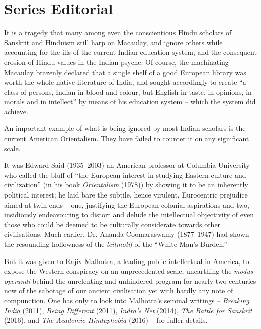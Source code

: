 
\chapter*{Series Editorial}

It is a tragedy that many among even the conscientious Hindu scholars of Sanskrit and Hinduism still harp on Macaulay, and ignore others while accounting for the ills of the current Indian education system, and the consequent erosion of Hindu values in the Indian psyche. Of course, the machinating Macaulay brazenly declared that a single shelf of a good European library was worth the whole native literature of India, and sought accordingly to create “a class of persons, Indian in blood and colour, but English in taste, in opinions, in morals and in intellect” by means of his education system – which the system did achieve. 

An important example of what is being ignored by most Indian scholars is the current American Orientalism. They have failed to counter it on any significant scale. 

It was Edward Said (1935–2003) an American professor at Columbia University who called the bluff of “the European interest in studying Eastern culture and civilization” (in his book \textit{Orientalism} (1978)) by showing it to be an inherently political interest; he laid bare the subtile, hence virulent, Eurocentric prejudice aimed at twin ends – one, justifying the European colonial aspirations and two, insidiously endeavouring to distort and delude the intellectual objectivity of even those who could be deemed to be culturally considerate towards other civilisations. Much earlier, Dr. Ananda Coomaraswamy (1877–1947) had shown the resounding hollowness of the \textit{leitmotif} of the “White Man’s Burden.” 

But it was given to Rajiv Malhotra, a leading public intellectual in America, to expose the Western conspiracy on an unprecedented scale, unearthing the \textit{modus operandi} behind the unrelenting and unhindered program for nearly two centuries now of the sabotage of our ancient civilisation yet with hardly any note of compunction. One has only to look into Malhotra’s seminal writings – \textit{Breaking India} (2011), \textit{Being Different} (2011), \textit{Indra’s Net} (2014), \textit{The Battle for Sanskrit} (2016), and \textit{The Academic Hinduphobia} (2016) – for fuller details.

